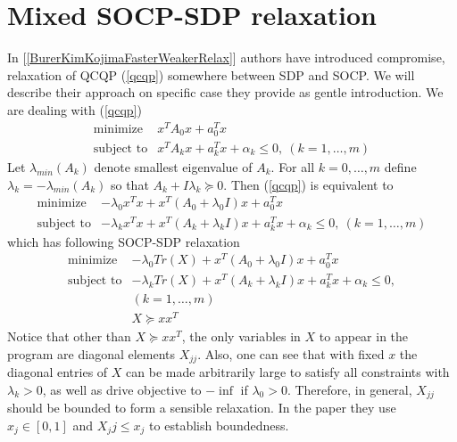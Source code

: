 \documentclass[10pt,oneside]{book}
\theoremstyle{definition}
\begin{document}
\section{Mixed SOCP-SDP relaxation}

In [\ref{BurerKimKojimaFasterWeakerRelax}] authors have introduced compromise, relaxation of QCQP (\ref{qcqp}) somewhere between SDP and SOCP. We will describe their approach on specific case they provide as gentle introduction.
We are dealing with (\ref{qcqp})
\begin{equation}
\begin{array}{ll}
\mbox{minimize}& x^TA_0x + a_0^Tx \\
\mbox{subject to}& x^TA_kx + a_k^Tx + \alpha_k \leq 0, \  (k = 1,\dots ,m)
\end{array} 
\end{equation}
Let  $\lambda_{min}(A_k)$ denote smallest eigenvalue of $A_k$.
For all $k=0,\dots ,m$ define $\lambda_k=-\lambda_{min}(A_k)$ so that $A_k + I\lambda_k\succeq 0$. Then (\ref{qcqp}) is equivalent to 
\begin{equation*}
\begin{array}{ll}
\mbox{minimize}& -\lambda_0 x^Tx +  x^T(A_0+\lambda_0 I)x + a_0^Tx \\
\mbox{subject to}& -\lambda_kx^Tx +  x^T(A_k+\lambda_kI)x + a_k^Tx + \alpha_k \leq 0, \  (k = 1,\dots ,m)
\end{array} 
\end{equation*}
which has following SOCP-SDP relaxation
\begin{equation}
\label{InBetweenSOCPSDP1}
\begin{array}{ll}
\mbox{minimize}& -\lambda_0 Tr(X) +  x^T(A_0+\lambda_0 I)x + a_0^Tx \\
\mbox{subject to}& -\lambda_k Tr(X) +  x^T(A_k+\lambda_kI)x + a_k^Tx + \alpha_k \leq 0, \\  
&(k = 1,\dots ,m) \\
& X\succeq xx^T
\end{array} 
\end{equation}
Notice that other than $X\succeq xx^T$, the only variables in $X$ to appear in the program are diagonal elements $X_{jj}$.
Also, one can see that with fixed $x$ the diagonal entries of $X$ can be made arbitrarily large to satisfy all constraints with $\lambda_k>0$, as well as drive objective to $-\inf$ if $\lambda_0>0$. Therefore, in general, $X_{jj}$ should be bounded to form a sensible relaxation. In the paper they use $x_j\in [0,1]$ and $X_jj\leq x_j$ to establish boundedness.
\end{document}
